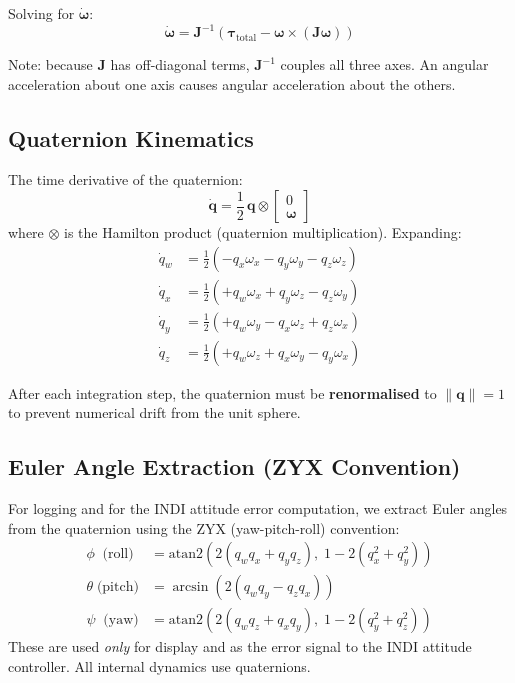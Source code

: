 \documentclass[12pt, a4paper]{article}
\newcommand{\bq}{\bm{q}}
\newcommand{\bomega}{\bm{\omega}}
\newcommand{\btau}{\bm{\tau}}
\newcommand{\bJ}{\bm{J}}
\begin{document}
Solving for $\dot{\bomega}$:
\begin{equation}
    \dot{\bomega} = \bJ^{-1} \left( \btau_{\text{total}} - \bomega \times (\bJ \bomega) \right)
\end{equation}

Note: because $\bJ$ has off-diagonal terms, $\bJ^{-1}$ couples all three axes.  An angular acceleration about one axis causes angular acceleration about the others.

\subsection{Quaternion Kinematics}

The time derivative of the quaternion:
\begin{equation}
    \dot{\bq} = \frac{1}{2} \, \bq \otimes \begin{bmatrix} 0 \\ \bomega \end{bmatrix}
    \label{eq:quat_kin}
\end{equation}
where $\otimes$ is the Hamilton product (quaternion multiplication).  Expanding:
\begin{align}
    \dot{q}_w &= \tfrac{1}{2} (-q_x \omega_x - q_y \omega_y - q_z \omega_z) \\
    \dot{q}_x &= \tfrac{1}{2} (+q_w \omega_x + q_y \omega_z - q_z \omega_y) \\
    \dot{q}_y &= \tfrac{1}{2} (+q_w \omega_y - q_x \omega_z + q_z \omega_x) \\
    \dot{q}_z &= \tfrac{1}{2} (+q_w \omega_z + q_x \omega_y - q_y \omega_x)
\end{align}

After each integration step, the quaternion must be \textbf{renormalised} to $\|\bq\| = 1$ to prevent numerical drift from the unit sphere.

\subsection{Euler Angle Extraction (ZYX Convention)}

For logging and for the INDI attitude error computation, we extract Euler angles from the quaternion using the ZYX (yaw-pitch-roll) convention:
\begin{align}
    \phi \;\;\text{(roll)} &= \text{atan2}(2(q_w q_x + q_y q_z), \; 1 - 2(q_x^2 + q_y^2)) \\
    \theta \;\text{(pitch)} &= \arcsin(2(q_w q_y - q_z q_x)) \\
    \psi \;\;\text{(yaw)} &= \text{atan2}(2(q_w q_z + q_x q_y), \; 1 - 2(q_y^2 + q_z^2))
\end{align}
These are used \emph{only} for display and as the error signal to the INDI attitude controller.  All internal dynamics use quaternions.
\end{document}
